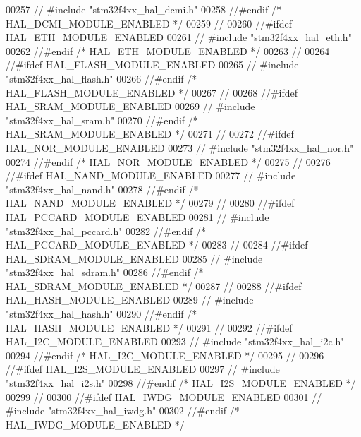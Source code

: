 \begin{DoxyCode}
00257 \textcolor{comment}{//  #include "stm32f4xx\_hal\_dcmi.h"}
00258 \textcolor{comment}{//#endif /* HAL\_DCMI\_MODULE\_ENABLED */}
00259 \textcolor{comment}{//}
00260 \textcolor{comment}{//#ifdef HAL\_ETH\_MODULE\_ENABLED}
00261 \textcolor{comment}{//  #include "stm32f4xx\_hal\_eth.h"}
00262 \textcolor{comment}{//#endif /* HAL\_ETH\_MODULE\_ENABLED */}
00263 \textcolor{comment}{//}
00264 \textcolor{comment}{//#ifdef HAL\_FLASH\_MODULE\_ENABLED}
00265 \textcolor{comment}{//  #include "stm32f4xx\_hal\_flash.h"}
00266 \textcolor{comment}{//#endif /* HAL\_FLASH\_MODULE\_ENABLED */}
00267 \textcolor{comment}{//}
00268 \textcolor{comment}{//#ifdef HAL\_SRAM\_MODULE\_ENABLED}
00269 \textcolor{comment}{//  #include "stm32f4xx\_hal\_sram.h"}
00270 \textcolor{comment}{//#endif /* HAL\_SRAM\_MODULE\_ENABLED */}
00271 \textcolor{comment}{//}
00272 \textcolor{comment}{//#ifdef HAL\_NOR\_MODULE\_ENABLED}
00273 \textcolor{comment}{//  #include "stm32f4xx\_hal\_nor.h"}
00274 \textcolor{comment}{//#endif /* HAL\_NOR\_MODULE\_ENABLED */}
00275 \textcolor{comment}{//}
00276 \textcolor{comment}{//#ifdef HAL\_NAND\_MODULE\_ENABLED}
00277 \textcolor{comment}{//  #include "stm32f4xx\_hal\_nand.h"}
00278 \textcolor{comment}{//#endif /* HAL\_NAND\_MODULE\_ENABLED */}
00279 \textcolor{comment}{//}
00280 \textcolor{comment}{//#ifdef HAL\_PCCARD\_MODULE\_ENABLED}
00281 \textcolor{comment}{//  #include "stm32f4xx\_hal\_pccard.h"}
00282 \textcolor{comment}{//#endif /* HAL\_PCCARD\_MODULE\_ENABLED */}
00283 \textcolor{comment}{//}
00284 \textcolor{comment}{//#ifdef HAL\_SDRAM\_MODULE\_ENABLED}
00285 \textcolor{comment}{//  #include "stm32f4xx\_hal\_sdram.h"}
00286 \textcolor{comment}{//#endif /* HAL\_SDRAM\_MODULE\_ENABLED */}
00287 \textcolor{comment}{//}
00288 \textcolor{comment}{//#ifdef HAL\_HASH\_MODULE\_ENABLED}
00289 \textcolor{comment}{// #include "stm32f4xx\_hal\_hash.h"}
00290 \textcolor{comment}{//#endif /* HAL\_HASH\_MODULE\_ENABLED */}
00291 \textcolor{comment}{//}
00292 \textcolor{comment}{//#ifdef HAL\_I2C\_MODULE\_ENABLED}
00293 \textcolor{comment}{// #include "stm32f4xx\_hal\_i2c.h"}
00294 \textcolor{comment}{//#endif /* HAL\_I2C\_MODULE\_ENABLED */}
00295 \textcolor{comment}{//}
00296 \textcolor{comment}{//#ifdef HAL\_I2S\_MODULE\_ENABLED}
00297 \textcolor{comment}{// #include "stm32f4xx\_hal\_i2s.h"}
00298 \textcolor{comment}{//#endif /* HAL\_I2S\_MODULE\_ENABLED */}
00299 \textcolor{comment}{//}
00300 \textcolor{comment}{//#ifdef HAL\_IWDG\_MODULE\_ENABLED}
00301 \textcolor{comment}{// #include "stm32f4xx\_hal\_iwdg.h"}
00302 \textcolor{comment}{//#endif /* HAL\_IWDG\_MODULE\_ENABLED */}

\end{DoxyCode}
